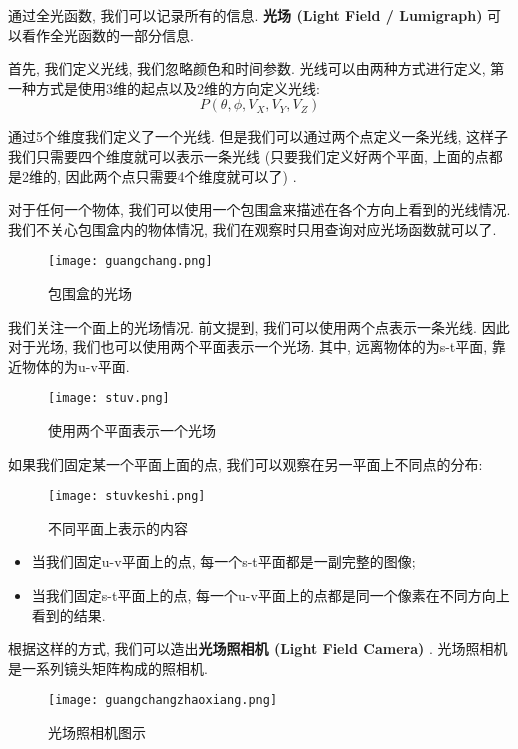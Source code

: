 通过全光函数, 我们可以记录所有的信息. \textbf{光场 (Light Field / Lumigraph) }可以看作全光函数的一部分信息. 

首先, 我们定义光线, 我们忽略颜色和时间参数. 光线可以由两种方式进行定义, 第一种方式是使用3维的起点以及2维的方向定义光线: 
\begin{equation}
	P(\theta,\phi,V_X,V_Y,V_Z)
\end{equation}

通过5个维度我们定义了一个光线. 但是我们可以通过两个点定义一条光线, 这样子我们只需要四个维度就可以表示一条光线 (只要我们定义好两个平面, 上面的点都是2维的, 因此两个点只需要4个维度就可以了) . 

对于任何一个物体, 我们可以使用一个包围盒来描述在各个方向上看到的光线情况. 我们不关心包围盒内的物体情况, 我们在观察时只用查询对应光场函数就可以了. 

\begin{figure}[H]
	\centering
	\texttt{[image: guangchang.png]}
	\caption{包围盒的光场}
	\label{fig:guangchang}
\end{figure}

我们关注一个面上的光场情况. 前文提到, 我们可以使用两个点表示一条光线. 因此对于光场, 我们也可以使用两个平面表示一个光场. 其中, 远离物体的为s-t平面, 靠近物体的为u-v平面. 

\begin{figure}[H]
	\centering
	\texttt{[image: stuv.png]}
	\caption{使用两个平面表示一个光场}
	\label{fig:stuv}
\end{figure}

如果我们固定某一个平面上面的点, 我们可以观察在另一平面上不同点的分布: 

\begin{figure}[H]
	\centering
	\texttt{[image: stuvkeshi.png]}
	\caption{不同平面上表示的内容}
	\label{fig:stuvkeshi}
\end{figure}

\begin{itemize}
	\item 当我们固定u-v平面上的点, 每一个s-t平面都是一副完整的图像; 
	\item 当我们固定s-t平面上的点, 每一个u-v平面上的点都是同一个像素在不同方向上看到的结果. 
\end{itemize}

根据这样的方式, 我们可以造出\textbf{光场照相机 (Light Field Camera) }. 光场照相机是一系列镜头矩阵构成的照相机. 

\begin{figure}[H]
	\centering
	\texttt{[image: guangchangzhaoxiang.png]}
	\caption{光场照相机图示}
	\label{fig:guangchangzhaoxiang}
\end{figure}

